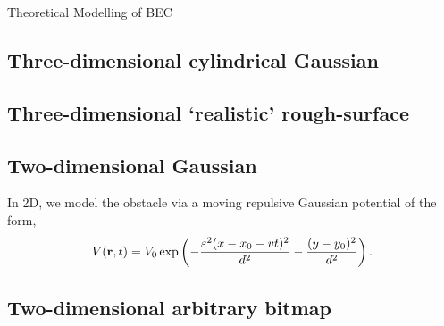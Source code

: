 \begin{chapter}{\label{cha:theoretical_model}Theoretical Modelling of BEC}
\subsection{\label{section:3dcylinderpotential} Three-dimensional cylindrical Gaussian}
\subsection{\label{section:3dafmpotential} Three-dimensional `realistic' rough-surface}
\subsection{\label{section:2dobjpotential} Two-dimensional Gaussian}

In 2D, we model the obstacle via a moving repulsive Gaussian potential of the form,
\begin{equation}
V({\bf r}, t)=V_0 \exp \left( -\frac{\varepsilon^2(x-x_0-vt)^2}{d^2} -\frac{(y-y_0)^2}{d^2}\right).
\label{eq:potential2D}
\end{equation}




\subsection{\label{section:2dbitmappotential} Two-dimensional arbitrary bitmap}
\end{chapter}
